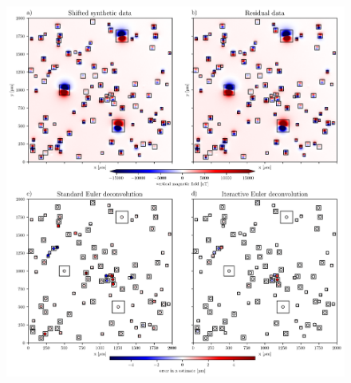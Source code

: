 \begin{figure}[tb!]
  \centering
  \includegraphics[width=1\linewidth]{figures/euler-comparion-2.png}
  \caption{
      }
  \label{euler2}
\end{figure}


